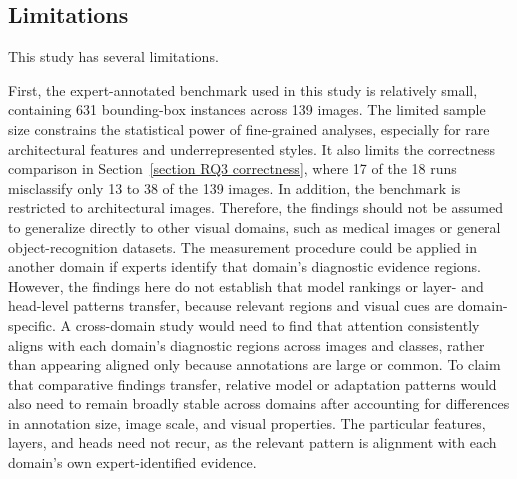 \documentclass[lineno,pdflatex,sn-mathphys-num]{sn-jnl}%
\theoremstyle{thmstyleone}%
\theoremstyle{thmstyletwo}%
\theoremstyle{thmstylethree}%
\begin{document}
\subsection{Limitations}

This study has several limitations. 

First, the expert-annotated benchmark \cite{Barz21WikiChurches} used in this study is relatively small, containing 631 bounding-box instances across 139 images. The limited sample size constrains the statistical power of fine-grained analyses, especially for rare architectural features and underrepresented styles. It also limits the correctness comparison in Section~\ref{section RQ3 correctness}, where 17 of the 18 runs misclassify only 13 to 38 of the 139 images. In addition, the benchmark is restricted to architectural images. Therefore, the findings should not be assumed to generalize directly to other visual domains, such as medical images or general object-recognition datasets. The measurement procedure could be applied in another domain if experts identify that domain's diagnostic evidence regions. However, the findings here do not establish that model rankings or layer- and head-level patterns transfer, because relevant regions and visual cues are domain-specific. A cross-domain study would need to find that attention consistently aligns with each domain's diagnostic regions across images and classes, rather than appearing aligned only because annotations are large or common. To claim that comparative findings transfer, relative model or adaptation patterns would also need to remain broadly stable across domains after accounting for differences in annotation size, image scale, and visual properties. The particular features, layers, and heads need not recur, as the relevant pattern is alignment with each domain's own expert-identified evidence. 
\end{document}
